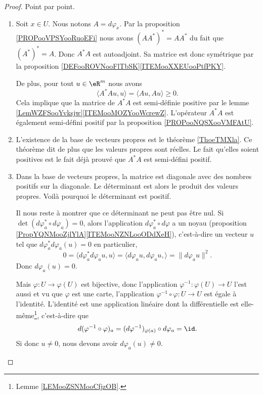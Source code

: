 \begin{proof}
	Point par point.
	\begin{enumerate}
		\item
		      Soit \( x\in U\). Nous notons \( A=d\varphi_x\). Par la proposition \ref{PROPooVPSYooRuoEFi} nous avons \( (AA^*)^*=AA^*\) du fait que \( (A^*)^*=A\). Donc \( A^*A\) est autoadjoint. Sa matrice est donc symétrique par la proposition \ref{DEFooROVNooFlTbSK}\ref{ITEMooXXEUooPtfPKY}.

		      De plus, pour tout \( u\in \eR^m\) nous avons
		      \begin{equation}
			      \langle A^*Au, u\rangle =\langle Au, Au\rangle \geq 0.
		      \end{equation}
		      Cela implique que la matrice de \( A^*A\) est semi-définie positive par le lemme \ref{LemWZFSooYvksjw}\ref{ITEMooMOZYooWcrewZ}. L'opérateur \( A^*A\) est également semi-défini positif par la proposition \ref{PROPooNQSXooVMFAtU}.
		\item
		      L'existence de la base de vecteurs propres est le théorème \ref{ThoeTMXla}. Ce théorème dit de plus que les valeurs propres sont réelles. Le fait qu'elles soient positives est le fait déjà prouvé que \( A^*A\) est semi-défini positif.
		\item
		      Dans la base de vecteurs propres, la matrice est diagonale avec des nombres positifs sur la diagonale. Le déterminant est alors le produit des valeurs propres. Voilà pourquoi le déterminant est positif.

		      Il nous reste à montrer que ce déterminant ne peut pas être nul. Si \( \det(d\varphi_a^*\circ d\varphi_a)=0\), alors l'application \( d\varphi_a^*\circ d\varphi\) a un noyau (proposition \ref{PropYQNMooZjlYlA}\ref{ITEMooNZNLooODdXeH}), c'est-à-dire un vecteur \( u\) tel que \( d\varphi_a^*d\varphi_a(u)=0\) en particulier,
		      \begin{equation}
			      0=\langle d\varphi_a^*d\varphi_au, u\rangle =\langle d\varphi_au,d\varphi_au, \rangle =\| d\varphi_au \|^2.
		      \end{equation}
		      Donc \( d\varphi_a(u)=0\).

		      Mais \( \varphi\colon U\to \varphi(U)\) est bijective, donc l'application \( \varphi^{-1}\colon \varphi(U)\to U\) l'est aussi et vu que \( \varphi\) est une carte, l'application \( \varphi^{-1}\circ\varphi\colon U\to U\) est égale à l'identité. L'identité est une application linéaire dont la différentielle est elle-même\footnote{Lemme \ref{LEMooZSNMooCfjzOB}.}, c'est-à-dire que
		      \begin{equation}
			      d(\varphi^{-1}\circ\varphi)_a=(d\varphi^{-1})_{\varphi(a)}\circ d\varphi_a=\id.
		      \end{equation}
		      Si donc \( u\neq 0\), nous devons avoir \( d\varphi_a(u)\neq 0\).
	\end{enumerate}
\end{proof}


